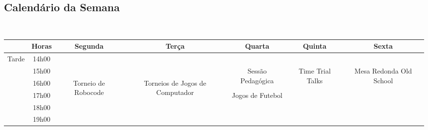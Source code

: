 \newpage
\subsection{Calendário da Semana}
~\\
\begin{center}
\begin{tabular}{|c||c|c|c|c|c|c|}
\hline
            & Horas & Segunda  & Terça    & Quarta  & Quinta  & Sexta    \\ \hline\hline
\multirow{6}{*}{Tarde}   & 14h00 &        &        &         &      &        \\ \cline{2-7}
             & 15h00 &       &        &
\multirow{2}{*}{\parbox{2.5cm}{\centering Sessão Pedagógica}}
                                       &
\multirow{5}{*}{\parbox{2.5cm}{\centering Time Trial Talks}}
                                        &
\multirow{5}{*}{\parbox{2.5cm}{\centering Mesa Redonda Old School}}
                                                 \\ \cline{2-4}
             & 16h00 &
\multirow{4}{*}{\parbox{2.5cm}{\centering Torneio de Robocode}}
                       &
\multirow{4}{*}{\parbox{2.5cm}{\centering Torneios de Jogos de Computador}}
                              &      &      &      \\ \cline{2-2} \cline{5-5}
             & 17h00 &      &      &
\multirow{3}{*}{\parbox{2.5cm}{\centering Jogos de Futebol}}
                                       &      &      \\ \cline{2-2}
             & 18h00 &        &        &         &      &        \\ \cline{2-2}
             & 19h00 &        &        &         &      &        \\  \hline\hline



\end{tabular}
\end{center}

